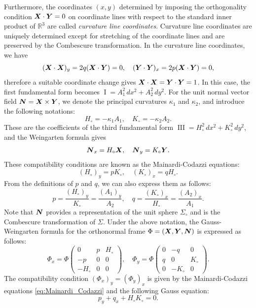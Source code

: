 \documentclass[a4paper]{amsart}
\def\bN{\mbox{\boldmath $N$}}
\def\R{\mathbb{R}}
\def\bX{\mbox{\boldmath $X$}}
\def\bY{\mbox{\boldmath $Y$}}
\newcommand{\first}{\operatorname{I}}
\newcommand{\third}{\operatorname{III}}
\theoremstyle{definition}
\begin{document}
Furthermore, the coordinates $(x, y)$ determined by imposing the orthogonality condition $\bX \cdot \bY = 0$ on coordinate lines with respect to the standard inner product of $\R^3$ are called \textit{curvature line coordinates}.
Curvature line coordinates are uniquely determined except for stretching of the coordinate lines and are preserved by the Combescure transformation.
In the curvature line coordinates, we have
\begin{equation}
(\bX \cdot \bX)_y = 2q (\bX \cdot \bY) = 0, \quad
(\bY \cdot \bY)_x = 2p (\bX \cdot \bY) = 0,
\end{equation}
therefore a suitable coordinate change gives $\bX \cdot \bX = \bY \cdot \bY = 1$.
In this case, the first fundamental form becomes $\first = A_1^2\, dx^2 + A_2^2 \, dy^2$.
For the unit normal vector field $\bN = \bX \times \bY$, we denote the principal curvatures $\kappa_1$ and $\kappa_2$, and introduce the following notations:
\begin{equation}
H_\circ = - \kappa_1 A_1, \quad
K_\circ = - \kappa_2 A_2.
\end{equation}
These are the coefficients of the third fundamental form $\third = H_\circ^2 \, dx^2 + K_\circ^2 \, dy^2$, and the Weingarten formula gives
\begin{equation}
\bN_x = H_\circ \bX, \quad
\bN_y = K_\circ \bY.
\end{equation}
These compatibility conditions are known as the Mainardi-Codazzi equations:
\begin{equation}
\label{eq:Mainardi_Codazzi}
(H_\circ)_y = p K_\circ, \quad
(K_\circ)_x = q H_\circ.
\end{equation}
From the definitions of $p$ and $q$, we can also express them as follows:
\begin{equation}
\label{eq:Mainardi_Codazzi_2}
p = \frac{(H_\circ)_y}{K_\circ} = \frac{(A_1)_y}{A_2}, \quad
q = \frac{(K_\circ)_x}{H_\circ} = \frac{(A_2)_x}{A_1}.
\end{equation}
Note that $\bN$ provides a representation of the unit sphere $\Sigma_\circ$ and is the Combescure transformation of $\Sigma$.
Under the above notation, the Gauss-Weingarten formula for the orthonormal frame $\Phi = (\bX, \bY, \bN)$ is expressed as follows:
\begin{equation}
\Phi_x = \Phi
\begin{pmatrix}
0 & p & H_\circ \\
- p & 0 & 0 \\
- H_\circ & 0 & 0
\end{pmatrix}, \quad
\Phi_y = \Phi
\begin{pmatrix}
0 & - q & 0 \\
q & 0 & K_\circ \\
0 & - K_\circ & 0    
\end{pmatrix}.
\end{equation}
The compatibility condition $(\Phi_x)_y = (\Phi_y)_x$ is given by the Mainardi-Codazzi equations \eqref{eq:Mainardi_Codazzi} and the following Gauss equation:
\begin{equation}
\label{eq:Gauss_eqn}
p_y + q_x + H_\circ K_\circ = 0.
\end{equation}
\end{document}
